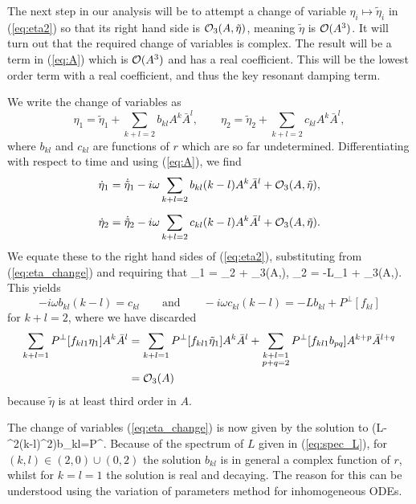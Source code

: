 The next step in our analysis will be to attempt a change of variable $\eta_i\mapsto\tilde{\eta}_i$ in (\ref{eq:eta2}) so that its right hand side is $\mathcal{O}_3(A,\tilde{\eta})$, meaning $\tilde{\eta}$ is $\mathcal{O}(A^3)$. It will turn out that the required change of variables is complex. The result will be a term in (\ref{eq:A}) which is $\mathcal{O}(A^3)$ and has a real coefficient. This will be the lowest order term with a real coefficient, and thus the key resonant damping term. %

We write the change of variables as
\begin{equation} \label{eq:eta_change}
\eta_1 = \tilde{\eta}_1 + \sum_{k+l=2}b_{kl}A^k\bar{A}^l, \qquad \eta_2 = \tilde{\eta}_2 + \sum_{k+l=2}c_{kl}A^k\bar{A}^l,
\end{equation}
where $b_{kl}$ and $c_{kl}$ are functions of $r$ which are so far undetermined. Differentiating with respect to time and using (\ref{eq:A}), we find
\begin{align*}
\dot{\eta}_1 &= \dot{\tilde{\eta}}_1 - i\omega\sum_{k+l=2}b_{kl}(k-l)A^k\bar{A}^l+\mathcal{O}_3(A,\tilde{\eta}), \\[5pt]
 \dot{\eta}_2 &= \dot{\tilde{\eta}}_2 - i\omega\sum_{k+l=2}c_{kl}(k-l)A^k\bar{A}^l + \mathcal{O}_3(A,\tilde{\eta}).
\end{align*}
We equate these to the right hand sides of (\ref{eq:eta2}), substituting from (\ref{eq:eta_change}) and requiring that
\be \label{eq:eta_tilde}
\dot{\tilde{\eta}}_1 = \tilde{\eta}_2 + \cO_3(A,\tilde{\eta}), \qquad \dot{\tilde{\eta}}_2 = -L\tilde{\eta}_1 + \cO_3(A,\tilde{\eta}).
\ee
This yields
\[
-i\omega b_{kl}(k-l)=c_{kl} \qquad\mbox{and}\qquad -i\omega c_{kl}(k-l)=-Lb_{kl} + P^\perp[f_{kl}]
\]
for $k+l=2$, where we have discarded
\begin{align*}
\sum_{k+l=1} P^\perp[f_{kl1}\eta_1]A^k\bar{A}^l &= \sum_{k+l=1} P^\perp [f_{kl1}\tilde{\eta}_1]A^k\bar{A}^l + \sum_{\substack{k+l=1 \\ p+q=2}} P^\perp [f_{kl1}b_{pq}]A^{k+p}\bar{A}^{l+q} \\
&= \mathcal{O}_3(A)
\end{align*}
because $\tilde{\eta}$ is at least third order in $A$.

The change of variables (\ref{eq:eta_change}) is now given by the solution to
\be
\big(L-\omega^2(k-l)^2\big)b_{kl}=P^\perp[f_{kl}].
\ee
Because of the spectrum of $L$ given in (\ref{eq:spec_L}), for $(k,l)\in(2,0)\cup (0,2)$ the solution $b_{kl}$ is in general a complex function of $r$, whilst for $k=l=1$ the solution is real and decaying. The reason for this can be understood using the variation of parameters method for inhomogeneous ODEs.

